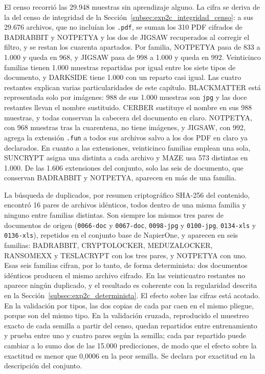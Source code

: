 El censo recorrió las 29.948 muestras sin aprendizaje alguno. La cifra se deriva de la del censo de integridad de la Sección~\ref{subsec:exp2c_integridad_censo}: a sus 29.676 archivos, que no incluían los \texttt{.pdf}, se suman los 310 PDF cifrados de BADRABBIT y NOTPETYA y los dos de JIGSAW recuperados al corregir el filtro, y se restan los cuarenta apartados. Por familia, NOTPETYA pasa de 833 a 1.000 y queda en 968, y JIGSAW pasa de 998 a 1.000 y queda en 992. Veinticinco familias tienen 1.000 muestras repartidas por igual entre los siete tipos de documento, y DARKSIDE tiene 1.000 con un reparto casi igual. Las cuatro restantes explican varias particularidades de este capítulo. BLACKMATTER está representada solo por imágenes: 988 de sus 1.000 muestras son \texttt{jpg} y las doce restantes llevan el nombre sustituido. CERBER sustituye el nombre en sus 988 muestras, y todas conservan la cabecera del documento en claro. NOTPETYA, con 968 muestras tras la cuarentena, no tiene imágenes, y JIGSAW, con 992, agrega la extensión \texttt{.fun} a todos sus archivos salvo a los dos PDF en claro ya declarados. En cuanto a las extensiones, veinticinco familias emplean una sola, SUNCRYPT asigna una distinta a cada archivo y MAZE usa 573 distintas en 1.000. De las 1.606 extensiones del conjunto, solo las seis de documento, que conservan BADRABBIT y NOTPETYA, aparecen en más de una familia.

La búsqueda de duplicados, por resumen criptográfico SHA-256 del contenido, encontró 16 pares de archivos idénticos, todos dentro de una misma familia y ninguno entre familias distintas. Son siempre los mismos tres pares de documentos de origen (\texttt{0066-doc} y \texttt{0067-doc}, \texttt{0098-jpg} y \texttt{0100-jpg}, \texttt{0134-xls} y \texttt{0136-xls}), repetidos en el conjunto base de NapierOne, y aparecen en seis familias: BADRABBIT, CRYPTOLOCKER, MEDUZALOCKER, RANSOMEXX y TESLACRYPT con los tres pares, y NOTPETYA con uno. Esas seis familias cifran, por lo tanto, de forma determinista: dos documentos idénticos producen el mismo archivo cifrado. En las veinticuatro restantes no aparece ningún duplicado, y el resultado es coherente con la regularidad descrita en la Sección~\ref{subsec:exp2c_determinista}. El efecto sobre las cifras está acotado. En la validación por tipos, las dos copias de cada par caen en el mismo pliegue, porque son del mismo tipo. En la validación cruzada, reproducido el muestreo exacto de cada semilla a partir del censo, quedan repartidos entre entrenamiento y prueba entre uno y cuatro pares según la semilla; cada par repartido puede cambiar a lo sumo dos de las 15.000 predicciones, de modo que el efecto sobre la exactitud es menor que 0,0006 en la peor semilla. Se declara por exactitud en la descripción del conjunto.

